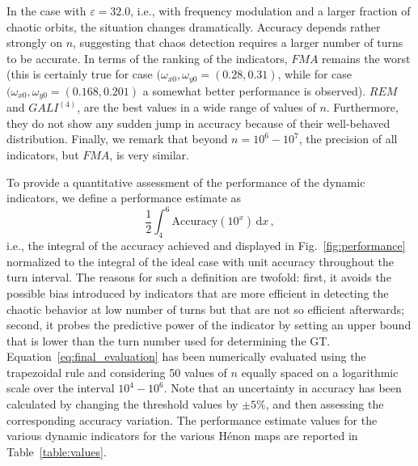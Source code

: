 In the case with $\varepsilon=32.0$, i.e., with frequency modulation and a larger fraction of chaotic orbits, the situation changes dramatically. Accuracy depends rather strongly on $n$, suggesting that chaos detection requires a larger number of turns to be accurate. In terms of the ranking of the indicators, $FMA$ remains the worst (this is certainly true for case $(\omega_{x0}, \omega_{y0}=(0.28, 0.31)$, while for case $(\omega_{x0}, \omega_{y0}=(0.168, 0.201)$ a somewhat better performance is observed). $REM$ and $GALI^{(4)}$, are the best values in a wide range of values of $n$. Furthermore, they do not show any sudden jump in accuracy because of their well-behaved distribution. Finally, we remark that beyond $n = 10^6 - 10^7$, the precision of all indicators, but $FMA$, is very similar.

To provide a quantitative assessment of the performance of the dynamic indicators, we define a performance estimate as
\begin{equation}
    \frac{1}{2}\int_4^6 \text{Accuracy}(10^x) \,\mathrm{d}x \,,
    \label{eq:final_evaluation}
\end{equation}
i.e., the integral of the accuracy achieved and displayed in Fig.~\ref{fig:performance} normalized to the integral of the ideal case with unit accuracy throughout the turn interval. The reasons for such a definition are twofold: first, it avoids the possible bias introduced by indicators that are more efficient in detecting the chaotic behavior at low number of turns but that are not so efficient afterwards; second, it probes the predictive power of the indicator by setting an upper bound that is lower than the turn number used for determining the GT. Equation~\eqref{eq:final_evaluation} has been numerically evaluated using the trapezoidal rule and considering 50 values of $n$ equally spaced on a logarithmic scale over the interval $10^4-10^6$. Note that an uncertainty in accuracy has been calculated by changing the threshold values by $\pm 5\%$, and then assessing the corresponding accuracy variation. The performance estimate values for the various dynamic indicators for the various H\'enon maps are reported in Table~\ref{table:values}. 

